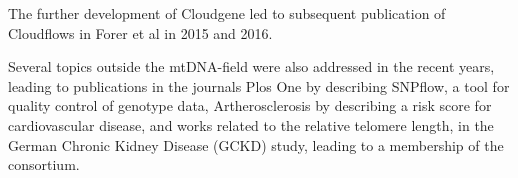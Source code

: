 The further development of Cloudgene led to subsequent publication of Cloudflows in Forer et al\cite{Forer2015,Forer2016} in 2015 and 2016.

Several topics outside the mtDNA-field were also addressed in the recent years, leading to publications in the journals Plos One\cite{Weissensteiner2013} by describing SNPflow, a tool for quality control of genotype data, Artherosclerosis by describing a risk score for cardiovascular disease, and works related to the relative telomere length, in the German Chronic Kidney Disease (GCKD) study, leading to a membership of the consortium. 
